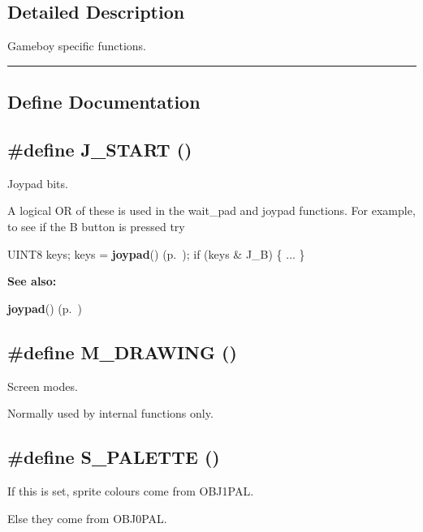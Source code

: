 \subsection*{Detailed Description}
Gameboy specific functions.\vspace{0.4cm}\hrule\vspace{0.2cm}
\subsection*{Define Documentation}
\label{gb.h_a0}
\subsection{\setlength{\rightskip}{0pt plus 5cm}\#define J\_\-START ()}

Joypad bits.

A logical OR of these is used in the wait\_\-pad and joypad functions. For example, to see if the B button is pressed try

UINT8 keys; keys = {\bf joypad}() {\rm (p.~\pageref{gb.h_a68})}; if (keys \& J\_\-B) \{ ... \}

\begin{Desc}
\item[{\bf See also: }]\par
{\bf joypad}() {\rm (p.~\pageref{gb.h_a68})} \end{Desc}
\label{gb.h_a8}
\subsection{\setlength{\rightskip}{0pt plus 5cm}\#define M\_\-DRAWING ()}

Screen modes.

Normally used by internal functions only. \label{gb.h_a13}
\subsection{\setlength{\rightskip}{0pt plus 5cm}\#define S\_\-PALETTE ()}

If this is set, sprite colours come from OBJ1PAL.

Else they come from OBJ0PAL. \label{gb.h_a17}
